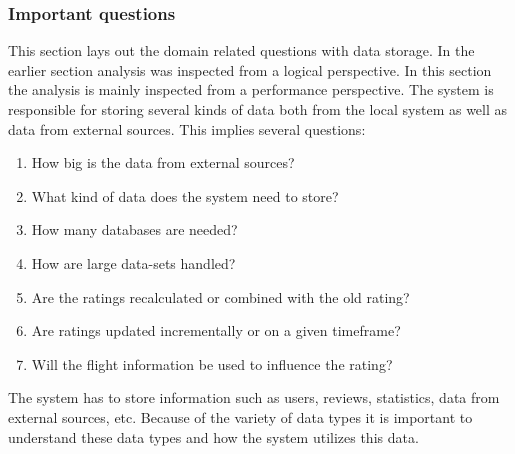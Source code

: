 \subsubsection{Important questions}
This section lays out the domain related questions with data storage. In the earlier section analysis was inspected from a logical perspective. In this section the analysis is mainly inspected from a performance perspective.
The system is responsible for storing several kinds of data both from the local system as well as data from external sources. This implies several questions:
\begin{enumerate}
\item How big is the data from external sources?
\item What kind of data does the system need to store?
\item How many databases are needed?
\item How are large data-sets handled?
\item Are the ratings recalculated or combined with the old rating?
\item Are ratings updated incrementally or on a given timeframe?
\item Will the flight information be used to influence the rating?
\end{enumerate}
The system has to store information such as users, reviews, statistics, data from external sources, etc. Because of the variety of data types it is important to understand these data types and how the system utilizes this data.

\newpage
